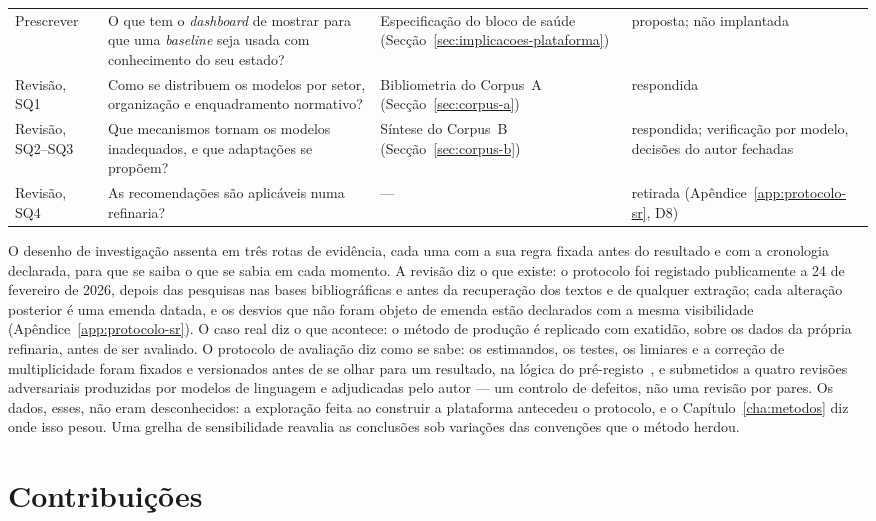 \begin{table}[htbp]
\begin{tabularx}{\linewidth}{@{}>{\raggedright\arraybackslash}p{1.7cm}>{\raggedright\arraybackslash}X>{\raggedright\arraybackslash}X>{\raggedright\arraybackslash}p{3.1cm}@{}}
    Prescrever & O que tem o \emph{dashboard} de mostrar para que uma \emph{baseline} seja usada com conhecimento do seu estado? & Especificação do bloco de saúde (Secção~\ref{sec:implicacoes-plataforma}) & proposta; não implantada \\
    \addlinespace
    Revisão, SQ1 & Como se distribuem os modelos por setor, organização e enquadramento normativo? & Bibliometria do Corpus~A (Secção~\ref{sec:corpus-a}) & respondida \\
    Revisão, SQ2--SQ3 & Que mecanismos tornam os modelos inadequados, e que adaptações se propõem? & Síntese do Corpus~B (Secção~\ref{sec:corpus-b}) & respondida; verificação por modelo, decisões do autor fechadas \\
    Revisão, SQ4 & As recomendações são aplicáveis numa refinaria? & --- & retirada (Apêndice~\ref{app:protocolo-sr}, D8) \\
    \bottomrule
  \end{tabularx}
\end{table}

O desenho de investigação assenta em três rotas de evidência, cada uma
com a sua regra fixada antes do resultado e com a cronologia declarada,
para que se saiba o que se sabia em cada momento. A revisão diz o que
existe: o protocolo foi registado publicamente a 24 de fevereiro de 2026,
depois das pesquisas nas bases bibliográficas e antes da recuperação dos
textos e de qualquer extração; cada alteração posterior é uma emenda
datada, e os desvios que não foram objeto de emenda estão declarados com
a mesma visibilidade (Apêndice~\ref{app:protocolo-sr}). O caso real diz o
que acontece: o método de produção é replicado com exatidão, sobre os
dados da própria refinaria, antes de ser avaliado. O protocolo de
avaliação diz como se sabe: os estimandos, os testes, os limiares e a
correção de multiplicidade foram fixados e versionados antes de se olhar
para um resultado, na lógica do pré-registo~\cite{Nosek2018}, e
submetidos a quatro revisões adversariais produzidas por modelos de
linguagem e adjudicadas pelo autor --- um controlo de defeitos, não uma
revisão por pares. Os dados, esses, não eram desconhecidos: a exploração
feita ao construir a plataforma antecedeu o protocolo, e o
Capítulo~\ref{cha:metodos} diz onde isso pesou. Uma grelha de
sensibilidade reavalia as conclusões sob variações das convenções que o
método herdou.

\section{Contribuições}
\label{sec:contribuicoes}

